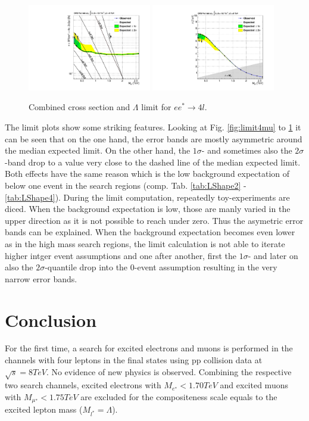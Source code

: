 \begin{figure}[hp!]
\begin{center}
\includegraphics[width=0.48\textwidth]{plot/limit_combined_estar.pdf}
\includegraphics[width=0.48\textwidth]{plot/limit_lambda_combined_estar.pdf}
\end{center}
\caption{\label{fig:limitestar}Combined cross section and $\Lambda$ limit for $e e^{*} \rightarrow 4l$.}
\end{figure}

The limit plots show some striking features. Looking at Fig. \ref{fig:limit4mu} to \ref{fig:limitestar} it can be seen that on the one hand, the error bands are mostly asymmetric around the median expected limit. On the other hand, the $1\sigma$- and sometimes also the $2\sigma$-band drop to a value very close to the dashed line of the median expected limit. Both effects have the same reason which is the low background expectation of below one event in the search regions (comp. Tab. \ref{tab:LShape2} - \ref{tab:LShape4}). During the limit computation, repeatedly toy-experiments are diced. When the background expectation is low, those are manly varied in the upper direction as it is not possible to reach under zero. Thus the asymetric error bands can be explained. When the background expectation becomes even lower as in the high mass search regions, the limit calculation is not able to iterate higher intger event assumptions and one after another, first the $1\sigma$- and later on also the $2\sigma$-quantile drop into the $0$-event assumption resulting in the very narrow error bands.

\section{Conclusion}
For the first time, a search for excited electrons and muons is performed in the channels with four leptons in the final states using pp collision data at $\sqrt{s} = 8 TeV$. No evidence of new physics is observed. Combining the respective two search channels, excited electrons with $M_{e^{∗}} < 1.70 TeV$ and excited muons with $M_{\mu^{∗}} < 1.75 TeV$ are excluded for the compositeness scale equals to the excited lepton mass ($M_{l^{*}} = \Lambda$).


\newpage

